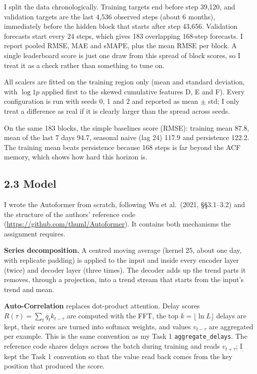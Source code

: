 \documentclass[11pt]{article}
\begin{document}
I split the data chronologically. Training targets end before step 39{,}120, and validation
targets are the last 4{,}536 observed steps (about 6 months), immediately before the hidden block
that starts after step 43{,}656. Validation forecasts start every 24 steps, which gives 183
overlapping 168-step forecasts. I report pooled RMSE, MAE and sMAPE, plus the mean RMSE per block.
A single leaderboard score is just one draw from this spread of block scores, so I treat it as a
check rather than something to tune on.

All scalers are fitted on the training region only (mean and standard deviation, with $\log1p$
applied first to the skewed cumulative features D, E and F). Every configuration is run with seeds
0, 1 and 2 and reported as mean $\pm$ std; I only treat a difference as real if it is clearly
larger than the spread across seeds.

On the same 183 blocks, the simple baselines score (RMSE): training mean 87.8, mean of the last 7
days 94.7, seasonal naive (lag 24) 117.9 and persistence 122.2. The training mean beats persistence
because 168 steps is far beyond the ACF memory, which shows how hard this horizon is.

\subsection*{2.3 Model}

I wrote the Autoformer from scratch, following Wu et al.\ (2021, \S\S3.1--3.2) and the structure
of the authors' reference code (\url{https://github.com/thuml/Autoformer}). It contains both
mechanisms the assignment requires.

\textbf{Series decomposition.} A centred moving average (kernel 25, about one day, with replicate
padding) is applied to the input and inside every encoder layer (twice) and decoder layer (three
times). The decoder adds up the trend parts it removes, through a projection, into a trend stream
that starts from the input's trend and mean.

\textbf{Auto-Correlation} replaces dot-product attention. Delay scores
$R(\tau)=\sum_t q_t k_{t-\tau}$ are computed with the FFT, the top $k=\lfloor \ln L\rfloor$ delays
are kept, their scores are turned into softmax weights, and values $v_{t-\tau}$ are aggregated per
example. This is the same convention as my Task 1 \texttt{aggregate\_delays}. The reference code
shares delays across the batch during training and reads $v_{t+\tau}$; I kept the Task 1
convention so that the value read back comes from the key position that produced the score.
\end{document}

